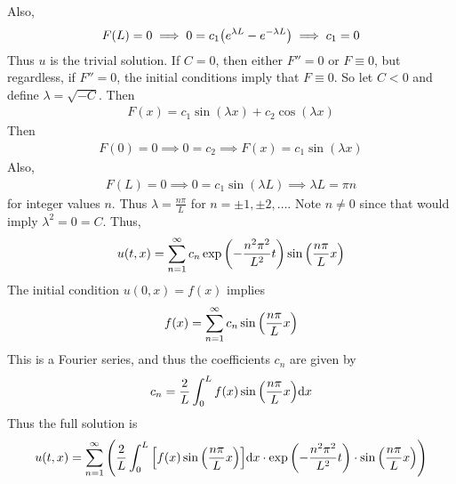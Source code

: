 \documentclass[paper=a4, fontsize=11pt]{scrartcl} %
\theoremstyle{plain}
\numberwithin{equation}{section} %
\numberwithin{figure}{section} %
\numberwithin{table}{section} %
\begin{document}
Also,
\begin{align*}
    F(L) = 0 \implies 0 = c_1\qty(e^{\lambda L} - e^{-\lambda L}) \implies c_1 = 0
\end{align*}
Thus $u$ is the trivial solution.  If $C = 0$, then either $F'' = 0$ or $F \equiv 0$, but regardless, if $F'' = 0$, the initial conditions imply that $F \equiv 0$.  So let $C < 0$ and define $\lambda = \sqrt{-C}$.  Then
\begin{align*}
    F(x) = c_1 \sin(\lambda x) + c_2 \cos(\lambda x)
\end{align*}
Then
\begin{align*}
    F(0) = 0 \implies 0 = c_2 \implies F(x) = c_1 \sin(\lambda x)
\end{align*}
Also,
\begin{align*}
    F(L) = 0 \implies 0 = c_1 \sin(\lambda L) \implies \lambda L = \pi n
\end{align*}
for integer values $n$.  Thus $\lambda = \frac{n\pi}{L}$ for $n = \pm 1, \pm 2, \dots$.  Note $n \neq 0$ since that would imply $\lambda^2 = 0 = C$.  Thus,
\begin{align*}
    u(t,x) = \sum_{n=1}^\infty c_n \exp\qty(-\frac{n^2 \pi^2}{L^2}t)\sin\qty(\frac{n\pi}{L}x)
\end{align*}
The initial condition $u(0,x) = f(x)$ implies
\begin{align*}
    f(x) = \sum_{n=1}^\infty c_n\sin\qty(\frac{n\pi}{L}x)
\end{align*}
This is a Fourier series, and thus the coefficients $c_n$ are given by
\begin{align*}
    c_n = \frac{2}{L}\int_0^L f(x) \sin\qty(\frac{n\pi}{L}x)\dd x
\end{align*}
Thus the full solution is
\begin{align*}
    u(t,x) = \sum_{n=1}^\infty \qty(\frac{2}{L}\int_0^L \qty[f(x) \sin\qty(\frac{n\pi}{L}x)]\dd x \cdot \exp\qty(-\frac{n^2 \pi^2}{L^2}t)\cdot\sin\qty(\frac{n\pi}{L}x))
\end{align*}
\end{document}
